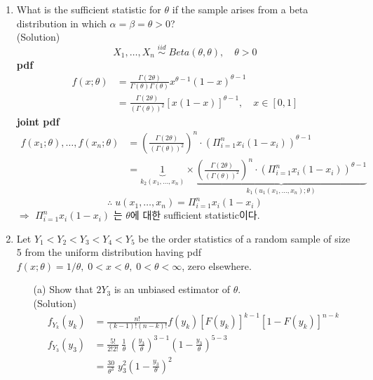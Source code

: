 \documentclass{oblivoir}
\newcommand{\flr}[1]{\left ( #1 \right )}
\newcommand{\blue}[1]{{\color{blue} #1}}
\begin{document}
\begin{enumerate}
\vspace{5mm}
\item 
What is the sufficient statistic for $\theta$ if the sample arises from a beta distribution in which $\alpha = \beta = \theta > 0$? \\
\blue{(Solution)} 
$$
X_1, \ldots, X_n \; \overset{iid}{\sim} \; Beta(\theta, \theta), \quad \theta > 0
$$
\textbf{pdf}
\begin{align*}
f(x;\theta) &= \frac{\Gamma(2\theta)}{\Gamma(\theta)\Gamma(\theta)} x^{\theta -1} (1-x)^{\theta-1}\\
&= \frac{\Gamma(2\theta)}{(\Gamma(\theta))^2} [x(1-x)]^{\theta - 1}, \quad x \in [0,1] 
\end{align*}
\textbf{joint pdf}
\begin{align*}
f(x_1;\theta), \ldots, f(x_n;\theta) &= \flr{\frac{\Gamma(2\theta)}{(\Gamma(\theta))^2}}^n \cdot \flr{\Pi_{i=1}^n x_i (1-x_i)}^{\theta - 1} \\
&= \underset{k_2(x_1,\ldots,x_n)}{\underbrace{1}} \times  \underset{k_1(u_1(x_1,\ldots, x_n);\theta)}{\underbrace{\flr{\frac{\Gamma(2\theta)}{(\Gamma(\theta))^2}}^n \cdot \flr{\Pi_{i=1}^n x_i (1-x_i)}^{\theta - 1}}}
\end{align*}
$$
\therefore \; u(x_1,\ldots, x_n) = \Pi_{i=1}^n x_i (1-x_i) 
$$
$\Rightarrow$ $\Pi_{i=1}^n x_i (1-x_i)$ 는 $\theta$에 대한 sufficient statistic이다.
\vspace{5mm}
\item 
Let $Y_1 < Y_2 < Y_3 < Y_4 < Y_5$ be the order statistics of a random sample of size 5 from the uniform distribution 
having pdf $f(x;\theta) = 1/ \theta, \; 0 < x < \theta, \; 0 < \theta < \infty$, zero elsewhere.
\begin{enumerate}
\item[(a)]
Show that $2Y_3$ is an unbiased estimator of $\theta$. \\
\blue{(Solution)}
\begin{align*}
f_{Y_k} (y_k) &= \frac{n!}{(k-1)!(n-k)!} f(y_k) [F(y_k)]^{k-1} [1-F(y_k)]^{n-k} \\
f_{Y_3} (y_3) &= \frac{5!}{2!2!} \; \frac{1}{\theta} \; \flr{\frac{y_3}{\theta}}^{3-1} \flr{1-\frac{y_3}{\theta}}^{5-3} \\
&= \frac{30}{\theta^3} \; y_3^2 \flr{1-\frac{y_3}{\theta}}^2

\end{align*}
\end{enumerate}
\end{enumerate}
\end{document}
